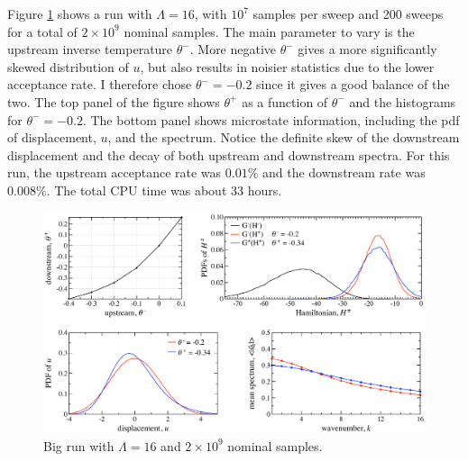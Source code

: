 \documentclass[12pt]{article}
\begin{document}
Figure \ref{Lambda16Run} shows a run with $\Lambda = 16$, with $10^7$ samples per sweep and 200 sweeps for a total of $2 \times 10^9$ nominal samples. The main parameter to vary is the upstream inverse temperature $\theta^-$. More negative $\theta^-$ gives a more significantly skewed distribution of $u$, but also results in noisier statistics due to the lower acceptance rate. I therefore chose $\theta^- = -0.2$ since it gives a good balance of the two. The top panel of the figure shows $\theta^+$ as a function of $\theta^-$ and the histograms for $\theta^- = -0.2$. The bottom panel shows microstate information, including the pdf of displacement, $u$, and the spectrum. Notice the definite skew of the downstream displacement and the decay of both upstream and downstream spectra. For this run, the upstream acceptance rate was $0.01\%$ and the downstream rate was $0.008\%$. The total CPU time was about 33 hours.

\begin{figure}%
\begin{center}
\includegraphics[width = 0.95 \textwidth]{Lambda16Run}
\caption{Big run with $\Lambda = 16$ and $2 \times 10^9$ nominal samples.}
\label{Lambda16Run}
\end{center}
\end{figure}
 



\end{document}
